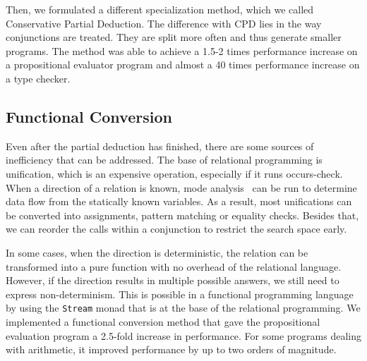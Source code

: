Then, we formulated a different specialization method, which we called Conservative Partial Deduction. 
The difference with CPD lies in the way conjunctions are treated. 
They are split more often and thus generate smaller programs. 
The method was able to achieve a 1.5-2 times performance increase on a propositional evaluator program and almost a 40 times performance increase on a type checker. 

\subsection{Functional Conversion}

Even after the partial deduction has finished, there are some sources of inefficiency that can be addressed. 
The base of relational programming is unification, which is an expensive operation, especially if it runs occurs-check. 
When a direction of a relation is known, mode analysis~\cite{somogyi1987system,smaus2000mode} can be run to determine data flow from the statically known variables. 
As a result, most unifications can be converted into assignments, pattern matching or equality checks. 
Besides that, we can reorder the calls within a conjunction to restrict the search space early. 

In some cases, when the direction is deterministic, the relation can be transformed into a pure function with no overhead of the relational language. 
However, if the direction results in multiple possible answers, we still need to express non-determinism. 
This is possible in a functional programming language by using the \texttt{Stream} monad that is at the base of the relational programming. 
We implemented a functional conversion method that gave the propositional evaluation program a 2.5-fold increase in performance.
For some programs dealing with arithmetic, it improved performance by up to two orders of magnitude.

